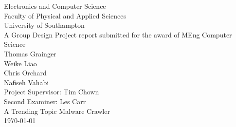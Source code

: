\begin{titlepage}

\begin{center}

{\large Electronics and Computer Science\\
Faculty of Physical and Applied Sciences\\
University of Southampton}\\[5em]

{\large A Group Design Project report submitted for the award of MEng
Computer Science}\\[5em]

{\large Thomas Grainger}\\
{\large Weike Liao}\\
{\large Chris Orchard}\\
{\large Nafiseh Vahabi}\\[5em]

{\large Project Supervisor: Tim Chown\\
Second Examiner: Les Carr}\\[5em]

{\LARGE A Trending Topic Malware Crawler}\\[5em]
{\large \today}\\[5em]


\end{center}

\end{titlepage}
